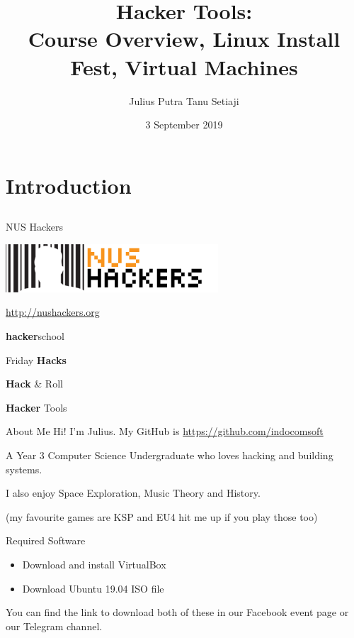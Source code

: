 \documentclass[12pt]{beamer}
\title{Hacker Tools: \\Course Overview, Linux Install Fest, Virtual Machines}
\author{Julius Putra Tanu Setiaji}
\date{3 September 2019}
\begin{document}
\frame[plain]{\titlepage}

\section{Introduction}
\subsection{}

\begin{frame}{NUS Hackers}

  \begin{center}
    \includegraphics[width=0.5\linewidth]{../NUSHackers}

    \url{http://nushackers.org}
  \end{center}

  \begin{center}
    \textbf{hacker}school

    Friday \textbf{Hacks}

    \textbf{Hack} \& Roll

    \textbf{Hacker} Tools
  \end{center}

\end{frame}

\begin{frame}{About Me}
  Hi! I'm Julius. My GitHub is \url{https://github.com/indocomsoft}

  A Year 3 Computer Science Undergraduate who loves hacking and building systems.

  I also enjoy Space Exploration, Music Theory and History.

    {\tiny (my favourite games are KSP and EU4 hit me up if you play those too)}
\end{frame}

\begin{frame}{Required Software}
  \begin{itemize}
    \item Download and install VirtualBox
    \item Download Ubuntu 19.04 ISO file
  \end{itemize}

  You can find the link to download both of these in our Facebook event page or our Telegram channel.
\end{frame}
\end{document}
